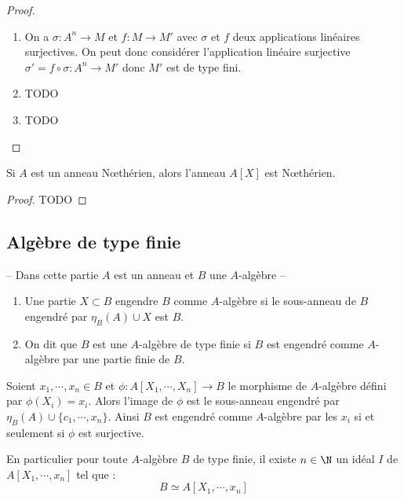 \begin{proof}\ 
 \begin{enumerate}
  \item On a $\sigma : A^n\rightarrow M$ et $f : M\rightarrow M'$ avec $\sigma$
et $f$ deux applications linéaires surjectives. On peut donc considérer
l'application linéaire surjective $\sigma'= f\circ \sigma : A^n\rightarrow M'$
donc $M'$ est de type fini.
\item TODO
\item TODO
 \end{enumerate}
\end{proof}

\begin{theo}
 
Si $A$ est un anneau N\oe{}thérien, alors l'anneau $A[X]$ est N\oe{}thérien.
\end{theo}

\begin{proof}
 TODO
\end{proof}

\subsection{Algèbre de type finie}
\begin{center}
-- Dans cette partie $A$ est un anneau et $B$ une $A$-algèbre -- 
\end{center}

\begin{defi}
\begin{enumerate}
\item Une partie $X\subset B$ engendre $B$ comme $A$-algèbre si le sous-anneau
de $B$ engendré par $\eta_B(A) \cup X$ est $B$.
\item On dit que $B$ est une $A$-algèbre de type finie si $B$ est engendré
comme $A$-algèbre par une partie finie de $B$.
\end{enumerate}
\end{defi}

\begin{example}[Remarque]
 Soient $x_1,\cdots,x_n \in B$ et $\phi : A[X_1,\cdots,X_n]\rightarrow B$ le
morphisme de $A$-algèbre défini par $\phi(X_i) = x_i$. Alors l'image de $\phi$
est le sous-anneau engendré par $\eta_B(A)\cup\{c_1,\cdots,x_n\}$. Ainsi $B$
est engendré comme $A$-algèbre par les $x_i$ si et seulement si $\phi$ est
surjective.

En particulier pour toute $A$-algèbre $B$ de type finie, il existe $n\in\N$ un
idéal $I$ de $A[X_1,\cdots,x_n]$ tel que :
\begin{displaymath}
 B \simeq A[X_1,\cdots,x_n]
\end{displaymath}
\end{example}

